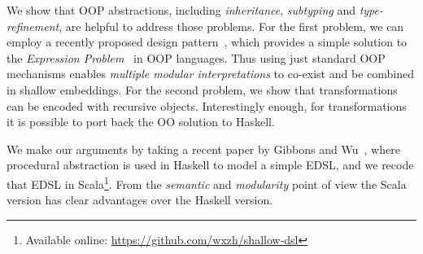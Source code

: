We show that OOP abstractions, including \emph{
  inheritance}, \emph{subtyping} and \emph{type-refinement}, are
helpful to address those problems. For the first problem, we can
employ a recently proposed design pattern~\cite{eptrivially16}, which provides a simple
solution to the \emph{Expression Problem}~\cite{expPb} in OOP languages. Thus
using just standard OOP mechanisms enables \emph{multiple modular
  interpretations} to co-exist and be combined in shallow embeddings.
For the second problem, we show that transformations can be encoded 
with recursive objects. Interestingly enough, for transformations it
is possible to port back the OO solution to
Haskell.

We make our arguments by taking a recent paper by Gibbons and Wu~\cite{gibbons2014folding},
where procedural abstraction is used in Haskell to model a simple
EDSL, and we recode that EDSL in Scala\footnote{Available online: \url{https://github.com/wxzh/shallow-dsl}}.
From the \emph{semantic} and \emph{modularity} point of view the
Scala version has clear advantages over the Haskell version.

\begin{comment}
In summary, our contributions are:

\begin{itemize}

\item {}

\item {\bf Multiple Modular Interpretations for Shallow Embeddings:} 
  We show that with standard OOP mechanisms it is easy to support multiple modular
  interpretations for shallow embeddings.

\item {\bf Transformations for Shallow Embeddings:} We show that
  transformations are encodable with recursive objects. Moreover, this technique
  can be ported back into functional programming as well.

\end{itemize}
\end{comment}
